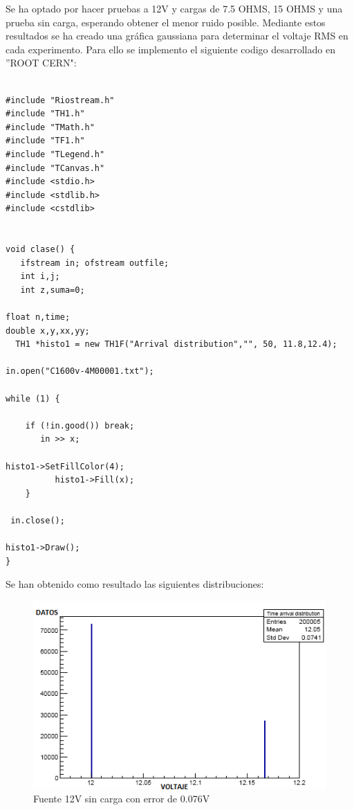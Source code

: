 Se ha optado por hacer pruebas a 12V y cargas de 7.5 OHMS, 15 OHMS y una prueba sin carga, esperando obtener el menor ruido posible. Mediante estos resultados se ha creado una gráfica gaussiana para determinar el voltaje RMS en cada experimento. Para ello se implemento el siguiente codigo desarrollado en ''ROOT CERN":\\

 

\begin{verbatim}

#include "Riostream.h"
#include "TH1.h"
#include "TMath.h"
#include "TF1.h"
#include "TLegend.h"
#include "TCanvas.h"
#include <stdio.h>
#include <stdlib.h>
#include <cstdlib>


void clase() {
   ifstream in; ofstream outfile;
   int i,j;
   int z,suma=0;

float n,time;
double x,y,xx,yy;
  TH1 *histo1 = new TH1F("Arrival distribution","", 50, 11.8,12.4);

in.open("C1600v-4M00001.txt"); 

while (1) {

	if (!in.good()) break;
       in >> x;
       
histo1->SetFillColor(4);
		  histo1->Fill(x);				    
	}
	   
 in.close();	  

histo1->Draw();
}
\end{verbatim}

Se han obtenido como resultado las siguientes distribuciones:

\begin{figure}[H]
\centering
\includegraphics[width=12cm]{Capitulo3/figs/sincarga.png}
\caption{Fuente 12V sin carga con error de 0.076V}
\end{figure}


